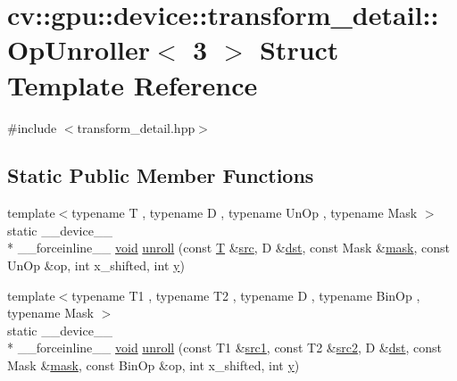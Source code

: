 \hypertarget{structcv_1_1gpu_1_1device_1_1transform__detail_1_1OpUnroller_3_013_01_4}{\section{cv\-:\-:gpu\-:\-:device\-:\-:transform\-\_\-detail\-:\-:Op\-Unroller$<$ 3 $>$ Struct Template Reference}
\label{structcv_1_1gpu_1_1device_1_1transform__detail_1_1OpUnroller_3_013_01_4}
}


{\ttfamily \#include $<$transform\-\_\-detail.\-hpp$>$}

\subsection*{Static Public Member Functions}
\begin{DoxyCompactItemize}
\item 
{\footnotesize template$<$typename T , typename D , typename Un\-Op , typename Mask $>$ }\\static \-\_\-\-\_\-device\-\_\-\-\_\- \\*
\-\_\-\-\_\-forceinline\-\_\-\-\_\- \hyperlink{legacy_8hpp_a8bb47f092d473522721002c86c13b94e}{void} \hyperlink{structcv_1_1gpu_1_1device_1_1transform__detail_1_1OpUnroller_3_013_01_4_a48cdb52073f086a922b76f861328c013}{unroll} (const \hyperlink{calib3d_8hpp_a3efb9551a871ddd0463079a808916717}{T} \&\hyperlink{legacy_8hpp_a371cd109b74033bc4366f584edd3dacc}{src}, D \&\hyperlink{photo__c_8h_aed13e2a25279b24dc954073233fef7a5}{dst}, const Mask \&\hyperlink{tracking_8hpp_a6b13ecd2fd6ec7ad422f1d7863c3ad19}{mask}, const Un\-Op \&op, int x\-\_\-shifted, int \hyperlink{highgui__c_8h_af1202c02b14870c18fb3a1da73e9e7c7}{y})
\item 
{\footnotesize template$<$typename T1 , typename T2 , typename D , typename Bin\-Op , typename Mask $>$ }\\static \-\_\-\-\_\-device\-\_\-\-\_\- \\*
\-\_\-\-\_\-forceinline\-\_\-\-\_\- \hyperlink{legacy_8hpp_a8bb47f092d473522721002c86c13b94e}{void} \hyperlink{structcv_1_1gpu_1_1device_1_1transform__detail_1_1OpUnroller_3_013_01_4_a697e8067b9c4658161eb951d8e1ed6e1}{unroll} (const T1 \&\hyperlink{core__c_8h_a897de4702c922f4cccda0d57ccdcafb3}{src1}, const T2 \&\hyperlink{core__c_8h_a7561a36d48069d54a6c8ac4e4750edfd}{src2}, D \&\hyperlink{photo__c_8h_aed13e2a25279b24dc954073233fef7a5}{dst}, const Mask \&\hyperlink{tracking_8hpp_a6b13ecd2fd6ec7ad422f1d7863c3ad19}{mask}, const Bin\-Op \&op, int x\-\_\-shifted, int \hyperlink{highgui__c_8h_af1202c02b14870c18fb3a1da73e9e7c7}{y})
\end{DoxyCompactItemize}


